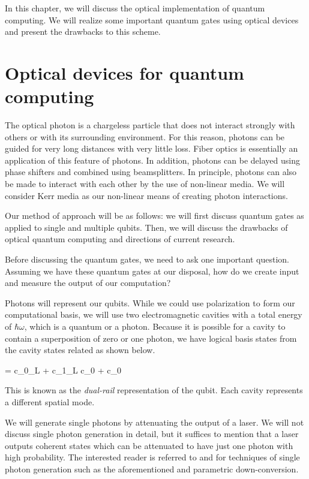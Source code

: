 In this chapter, we will discuss the optical implementation of quantum computing. We will realize some important quantum gates using optical devices and present the drawbacks to this scheme.
\section{Optical devices for quantum computing}
The optical photon is a chargeless particle that does not interact strongly with others or with its surrounding environment. For this reason, photons can be guided for very long distances with very little loss. Fiber optics is essentially an application of this feature of photons. In addition, photons can be delayed using phase shifters and combined using beamsplitters. In principle, photons can also be made to interact with each other by the use of non-linear media. We will consider Kerr media as our non-linear means of creating photon interactions. 

Our method of approach will be as follows: we will first discuss quantum gates as applied to single and multiple qubits. Then, we will discuss the drawbacks of optical quantum computing and directions of current research.

Before discussing the quantum gates, we need to ask one important question. Assuming we have these quantum gates at our disposal, how do we create input and measure the output of our computation? 

Photons will represent our qubits. While we could use polarization to form our computational basis, we will use two electromagnetic cavities with a total energy of $\hbar\omega$, which is a quantum or a photon. Because it is possible for a cavity to contain a superposition of zero or one photon, we have logical basis states from the cavity states related as shown below.

\beq
\ketp = c_0_L + c_1_L \equiv c_0 + c_0
\eeq

This is known as the \textit{dual-rail} representation of the qubit. Each cavity represents a different spatial mode.

We will generate single photons by attenuating the output of a laser. We will not discuss single photon generation in detail, but it suffices to mention that a laser outputs coherent states which can be attenuated to have just one photon with high probability. The interested reader is referred to \cite{foxqoptics} and \cite{milburnqoptics} for techniques of single photon generation such as the aforementioned and parametric down-conversion. 

